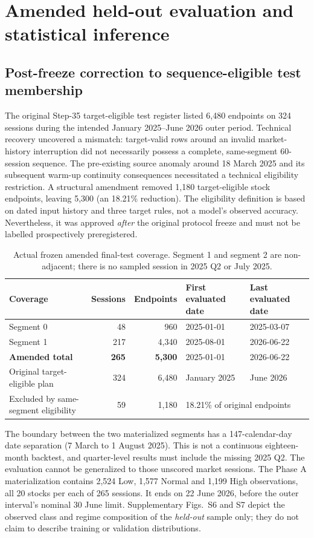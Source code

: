 \documentclass[fleqn,10pt]{wlscirep}
\begin{document}
\section{Amended held-out evaluation and statistical inference}\label{sec:protocol}
\subsection{Post-freeze correction to sequence-eligible test membership}
The original Step-35 target-eligible test register listed 6,480 endpoints on 324 sessions during the intended January 2025--June 2026 outer period. Technical recovery uncovered a mismatch: target-valid rows around an invalid market-history interruption did not necessarily possess a complete, same-segment 60-session sequence. The pre-existing source anomaly around 18 March 2025 and its subsequent warm-up continuity consequences necessitated a technical eligibility restriction. A structural amendment removed 1,180 target-eligible stock endpoints, leaving 5,300 (an 18.21\% reduction). The eligibility definition is based on dated input history and three target rules, not a model's observed accuracy. Nevertheless, it was approved \emph{after} the original protocol freeze and must not be labelled prospectively preregistered.

\begin{table}[htbp]\centering\small
\caption{Actual frozen amended final-test coverage. Segment 1 and segment 2 are non-adjacent; there is no sampled session in 2025 Q2 or July 2025.}\label{tab:coverage}
\begin{tabular}{@{}lrrll@{}}\toprule
Coverage & Sessions & Endpoints & First evaluated date & Last evaluated date \\ \midrule
Segment 0 & 48 & 960 & 2025-01-01 & 2025-03-07 \\
Segment 1 & 217 & 4,340 & 2025-08-01 & 2026-06-22 \\
\midrule
\textbf{Amended total} & \textbf{265} & \textbf{5,300} & 2025-01-01 & 2026-06-22 \\
Original target-eligible plan & 324 & 6,480 & January 2025 & June 2026 \\
Excluded by same-segment eligibility & 59 & 1,180 & \multicolumn{2}{l}{18.21\% of original endpoints} \\
\bottomrule\end{tabular}
\end{table}

The boundary between the two materialized segments has a 147-calendar-day date separation (7 March to 1 August 2025). This is not a continuous eighteen-month backtest, and quarter-level results must include the missing 2025 Q2. The evaluation cannot be generalized to those unscored market sessions. The Phase A materialization contains 2,524 Low, 1,577 Normal and 1,199 High observations, all 20 stocks per each of 265 sessions. It ends on 22 June 2026, before the outer interval's nominal 30 June limit. Supplementary Figs.~S6 and S7 depict the observed class and regime composition of the \emph{held-out} sample only; they do not claim to describe training or validation distributions.
\end{document}
